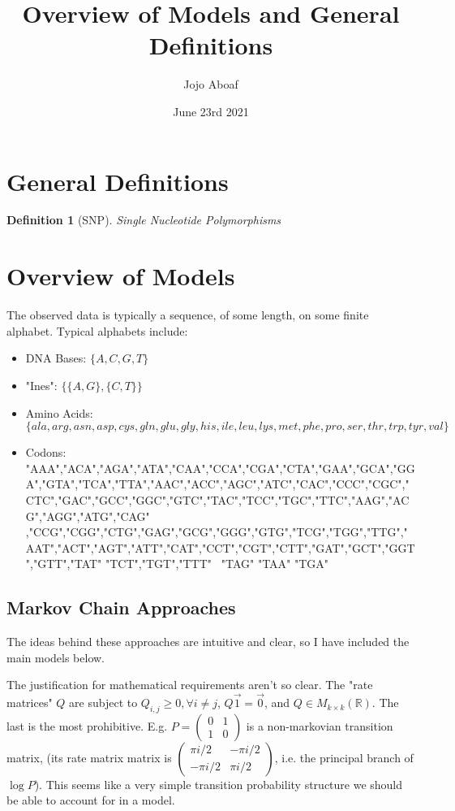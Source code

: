 \documentclass{article}
\title{Overview of Models and General Definitions}
\author{Jojo Aboaf}
\date{June 23rd 2021}
\newtheorem{definition}{Definition}
\begin{document}
\maketitle
\tableofcontents

\section{General Definitions}
\begin{definition}[SNP] Single Nucleotide Polymorphisms
\end{definition}

\section{Overview of Models}

The observed data is typically a sequence, of some length, on some finite alphabet. Typical alphabets include:
\begin{itemize}
\item DNA Bases: $\{A,C,G,T\}$
\item "Ines": $\{ \{A,G\}, \{C,T\}\}$
\item Amino Acids: $\{ala,arg,asn,asp,cys,gln,glu,gly,his,ile,leu,lys,met,phe,pro,ser,thr,trp,tyr,val\}$
\item Codons: {"AAA","ACA","AGA","ATA","CAA","CCA","CGA","CTA","GAA","GCA","GGA","GTA","TCA","TTA","AAC","ACC","AGC","ATC","CAC","CCC","CGC","CTC","GAC","GCC","GGC","GTC","TAC","TCC","TGC","TTC","AAG","ACG","AGG","ATG","CAG" ,"CCG","CGG","CTG","GAG","GCG","GGG","GTG","TCG","TGG","TTG","AAT","ACT","AGT","ATT","CAT","CCT","CGT","CTT","GAT","GCT","GGT","GTT","TAT"  "TCT","TGT","TTT"} \ {"TAG" "TAA" "TGA"}
\end{itemize}

\subsection{Markov Chain Approaches}
The ideas behind these approaches are intuitive and clear, so I have included the main models below.

The justification for mathematical requirements aren't so clear. The "rate matrices" $Q$ are subject to $Q_{i,j} \geq 0, \forall i\neq j$, $Q\vec{1} = \vec{0}$, and $Q \in M_{k\times k}(\mathbb{R})$. The last is the most prohibitive. E.g. $P = \begin{pmatrix} 0 & 1 \\ 1 & 0 \end{pmatrix}$ is a non-markovian transition matrix, (its rate matrix matrix is $\begin{pmatrix} \pi i/2 & - \pi i /2 \\ -\pi i/2 & \pi i /2\end{pmatrix}$, i.e. the principal branch of $\log P$). This seems like a very simple transition probability structure we should be able to account for in a model.
\end{document}
